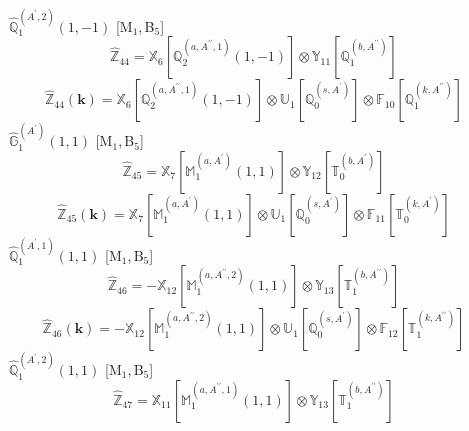 \documentclass[fleqn,10pt,landscape]{article}
\begin{document}
\begin{itemize}
\begin{dmath*}
\end{dmath*}
\vspace{4mm}
\noindent {} $\,\,\,\hat{\mathbb{Q}}_{1}^{(A^{\prime},2)}(1,-1)$ [M$_{1}$,\,B$_{5}$]
\begin{dmath*}
\hat{\mathbb{Z}}_{44}=\mathbb{X}_{6}[\mathbb{Q}_{2}^{(a,A^{\prime\prime},1)}(1,-1)] \otimes\mathbb{Y}_{11}[\mathbb{Q}_{1}^{(b,A^{\prime\prime})}]
\end{dmath*}
\begin{dmath*}
\hat{\mathbb{Z}}_{44}(\bm{k})=\mathbb{X}_{6}[\mathbb{Q}_{2}^{(a,A^{\prime\prime},1)}(1,-1)] \otimes\mathbb{U}_{1}[\mathbb{Q}_{0}^{(s,A^{\prime})}] \otimes\mathbb{F}_{10}[\mathbb{Q}_{1}^{(k,A^{\prime\prime})}]
\end{dmath*}
\vspace{4mm}
\noindent {} $\,\,\,\hat{\mathbb{G}}_{1}^{(A^{\prime})}(1,1)$ [M$_{1}$,\,B$_{5}$]
\begin{dmath*}
\hat{\mathbb{Z}}_{45}=\mathbb{X}_{7}[\mathbb{M}_{1}^{(a,A^{\prime})}(1,1)] \otimes\mathbb{Y}_{12}[\mathbb{T}_{0}^{(b,A^{\prime})}]
\end{dmath*}
\begin{dmath*}
\hat{\mathbb{Z}}_{45}(\bm{k})=\mathbb{X}_{7}[\mathbb{M}_{1}^{(a,A^{\prime})}(1,1)] \otimes\mathbb{U}_{1}[\mathbb{Q}_{0}^{(s,A^{\prime})}] \otimes\mathbb{F}_{11}[\mathbb{T}_{0}^{(k,A^{\prime})}]
\end{dmath*}
\vspace{4mm}
\noindent {} $\,\,\,\hat{\mathbb{Q}}_{1}^{(A^{\prime},1)}(1,1)$ [M$_{1}$,\,B$_{5}$]
\begin{dmath*}
\hat{\mathbb{Z}}_{46}=- \mathbb{X}_{12}[\mathbb{M}_{1}^{(a,A^{\prime\prime},2)}(1,1)] \otimes\mathbb{Y}_{13}[\mathbb{T}_{1}^{(b,A^{\prime\prime})}]
\end{dmath*}
\begin{dmath*}
\hat{\mathbb{Z}}_{46}(\bm{k})=- \mathbb{X}_{12}[\mathbb{M}_{1}^{(a,A^{\prime\prime},2)}(1,1)] \otimes\mathbb{U}_{1}[\mathbb{Q}_{0}^{(s,A^{\prime})}] \otimes\mathbb{F}_{12}[\mathbb{T}_{1}^{(k,A^{\prime\prime})}]
\end{dmath*}
\vspace{4mm}
\noindent {} $\,\,\,\hat{\mathbb{Q}}_{1}^{(A^{\prime},2)}(1,1)$ [M$_{1}$,\,B$_{5}$]
\begin{dmath*}
\hat{\mathbb{Z}}_{47}=\mathbb{X}_{11}[\mathbb{M}_{1}^{(a,A^{\prime\prime},1)}(1,1)] \otimes\mathbb{Y}_{13}[\mathbb{T}_{1}^{(b,A^{\prime\prime})}]
\end{dmath*}
\begin{dmath*}

\end{dmath*}
\end{itemize}
\end{document}
